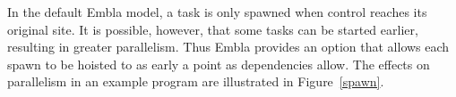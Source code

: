 In the default Embla model, a task is only spawned when control reaches its original site.
It is possible, however, that some tasks can be started earlier, resulting in greater parallelism.
Thus Embla provides an option that allows each spawn to be hoisted to as early a point as dependencies allow.
The effects on parallelism in an example program are illustrated in Figure~\ref{spawn}.

